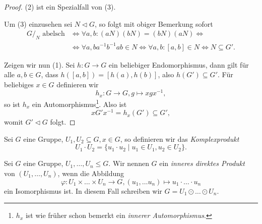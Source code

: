 \begin{proof}
    (2) ist ein Spezialfall von (3).

    Um (3) einzusehen sei $N \vartriangleleft G$, so folgt mit obiger Bemerkung sofort
    \begin{align*}
        G/_N \textrm{ abelsch} &\Leftrightarrow \forall a, b: (aN)(bN) = (bN)(aN) \Leftrightarrow \\ &\Leftrightarrow \forall a, b a^{-1}b^{-1} a b \in N \Leftrightarrow \forall a, b: [a, b] \in N \Leftrightarrow N \subseteq G'.
    \end{align*}

    Zeigen wir nun (1). Sei $h : G \to G$ ein beliebiger Endomorphismus, dann gilt für alle $a, b \in G$, dass $h([a,b]) = [h(a), h(b)]$, also $h(G') \subseteq G'$. Für beliebiges $x \in G$ definieren wir
    $$ h_x : G \to G, g \mapsto xgx^{-1}, $$
    so ist $h_x$ ein Automorphismus\footnote{$h_x$ ist wie früher schon bemerkt ein \emph{innerer Automorphismus}.}. Also ist
    $$ x G' x^{-1} = h_x(G') \subseteq G', $$
    womit $G' \vartriangleleft G$ folgt.
\end{proof}

\begin{definition}
    Sei $G$ eine Gruppe, $U_1, U_2 \subseteq G, x \in G$, so definieren wir das \emph{Komplexprodukt}
    $$ U_1 \cdot U_2 = \{ u_1 \cdot u_2 \mid u_1 \in U_1, u_2 \in U_2 \}. $$
\end{definition}

\begin{definition} \label{def:direktes-inneres-produkt}
    Sei $G$ eine Gruppe, $U_1, \hdots, U_n \leq G$. Wir nennen $G$ ein \emph{inneres direktes Produkt} von $(U_1, \hdots, U_n)$, wenn die Abbildung
    $$ \varphi : U_1 \times \hdots \times U_n \to G, (u_1, \hdots u_n) \mapsto u_1 \cdot \hdots \cdot u_n $$
    ein Isomorphismus ist. In diesem Fall schreiben wir $G = U_1 \odot \hdots \odot U_n$.
\end{definition}

